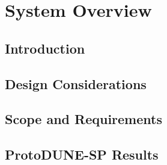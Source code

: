 \section{System Overview}
\label{sec:fdsp-tpcelec-overview}

\subsection{Introduction}
\label{sec:fdsp-tpcelec-overview-intro}

\subsection{Design Considerations}
\label{sec:fdsp-tpcelec-overview-design}

\subsection{Scope and Requirements}
\label{sec:fdsp-tpcelec-overview-scope}

\subsection{ProtoDUNE-SP Results}
\label{sec:fdsp-tpcelec-overview-pdune}

